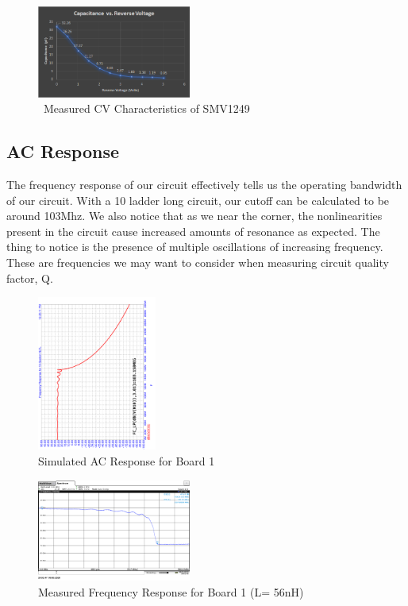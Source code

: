 \documentclass[journal]{IEEEtran} \usepackage[english]{babel}
\begin{document}
 
\begin{figure}[htb]
\centering
\includegraphics[width=0.45\textwidth]{SMV1249_CV}
\caption{\ Measured CV Characteristics of SMV1249 
}\label{fig:SMV1249CV}
\end{figure}


\subsection{AC Response}\label{ACMeasResults}

The frequency response of our circuit effectively tells us the operating
bandwidth of our circuit. With a 10 ladder long circuit, our cutoff can be
calculated to be around 103Mhz. We also notice that as we near the corner, the
nonlinearities present in the circuit cause increased amounts of resonance as
expected. The thing to notice is the presence of multiple oscillations of
increasing frequency. These are frequencies we may want to consider when
measuring circuit quality factor, Q.


\begin{figure}[htb]
\centering
\includegraphics[width=0.35\textwidth,angle = -90]{ACResponseB1.png}
\caption{Simulated AC Response for Board 1}
\label{fig:simACBoard1}
\end{figure}
 

\begin{figure}[htb]
\centering
\includegraphics[width=0.45\textwidth]{MeasuredACResponseB1.png}
\caption{Measured Frequency Response for Board 1 (L= 56nH)}
\label{fig:MeasACBoard1}
\end{figure}
\end{document}
